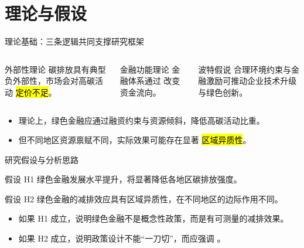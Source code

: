 \section{理论与假设}

\begin{frame}{理论基础：三条逻辑共同支撑研究框架}
  \begin{columns}[T,onlytextwidth]
    \begin{block}{外部性理论}
      碳排放具有典型负外部性，市场会对高碳活动 \hl{定价不足}。
    \end{block}

    \begin{exampleblock}{金融功能理论}
      金融体系通过  改变资金流向。
    \end{exampleblock}

    \begin{alertblock}{波特假说}
      合理环境约束与金融激励可推动企业技术升级与绿色创新。
    \end{alertblock}
  \end{columns}

  \vspace{0.8em}
  \begin{itemize}
    \item 理论上，绿色金融应通过融资约束与资源倾斜，降低高碳活动比重。
    \item 但不同地区资源禀赋不同，实际效果可能存在显著 \hl{区域异质性}。
  \end{itemize}
\end{frame}

\begin{frame}{研究假设与分析思路}
  \begin{block}{假设 H1}
    绿色金融发展水平提升，将显著降低各地区碳排放强度。
  \end{block}

  \begin{exampleblock}{假设 H2}
    绿色金融的减排效应具有区域异质性，在不同地区的边际作用不同。
  \end{exampleblock}

  \vspace{0.6em}
  \begin{itemize}
    \item 如果 H1 成立，说明绿色金融不是概念性政策，而是有可测量的减排效果。
    \item 如果 H2 成立，说明政策设计不能“一刀切”，而应强调 。
  \end{itemize}
\end{frame}
